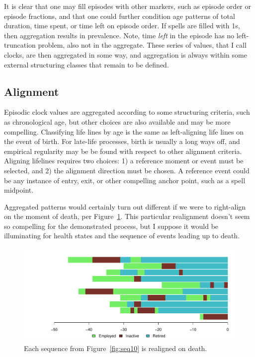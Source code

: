 \documentclass{article}
\begin{document}
It is clear that one may fill episodes with other markers, such as episode
order or episode fractions, and that one could further condition age patterns of
total duration, time spent, or time left on episode order. If spells are
filled with 1s, then aggregation results in prevalence. Note, time \emph{left}
in the episode has no left-truncation problem, also not in the aggregate. 
These series of values, that I call clocks, are then aggregated in some
way, and aggregation is always within some external structuring classes that
remain to be defined. 

\subsection{Alignment}
Episodic clock values are aggregated according to some
structuring criteria, such as chronological age, but other choices are also
available and may be more compelling. Classifying life lines by age is
the same as left-aligning life lines on the event of birth. For late-life
processes, birth is usually a long ways off, and empirical regularity may be
be found with respect to other alignment criteria. Aligning lifelines requires
two choices: 1) a reference moment or event must be selected, and 2) the
alignment direction must be chosen. A reference event could be any instance of
entry, exit, or other compelling anchor point, such as a spell midpoint.

Aggregated patterns
would certainly turn out different if we were to right-align on the moment of death, per Figure~\ref{fig:seq10death}.
This particular realignment doesn't seem so compelling for the
demonstrated process, but I suppose it would be
illuminating for health states and the sequence of events leading up to death.


\begin{figure}[ht!]
\centering
\caption{Each sequence from Figure~\ref{fig:seq10}
is realigned on death.}
\label{fig:seq10death}
\includegraphics[scale=.6]{Figures/Seq10deathalign.pdf}
\end{figure}
\end{document}
